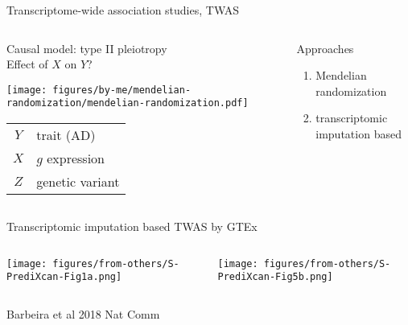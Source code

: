 \documentclass{beamer}
\begin{document}
\begin{frame}{Transcriptome-wide association studies, TWAS}
\begin{columns}[t]
\begin{column}{0.5\textwidth}

\begin{center}
Causal model:
type II pleiotropy\\
Effect of $X$ on $Y$?
\end{center}

\begin{center}
\texttt{[image: figures/by-me/mendelian-randomization/mendelian-randomization.pdf]}
\end{center}

{\footnotesize
\begin{tabular}{cl}
$Y$ & trait (AD) \\
$X$ & $g$ expression \\
$Z$ & genetic variant \\
\end{tabular}
}
\end{column}

\begin{column}{0.5\textwidth}

Approaches
\begin{enumerate}
\item Mendelian randomization
\item transcriptomic imputation based
\end{enumerate}

\end{column}
\end{columns}
\end{frame}

\begin{frame}{Transcriptomic imputation based TWAS by GTEx}
\begin{columns}[t]
\begin{column}{0.5\textwidth}

\texttt{[image: figures/from-others/S-PrediXcan-Fig1a.png]}

\end{column}

\begin{column}{0.5\textwidth}

\texttt{[image: figures/from-others/S-PrediXcan-Fig5b.png]}
\end{column}
\end{columns}
\tiny{Barbeira et al 2018 Nat Comm}
\end{frame}
\end{document}
